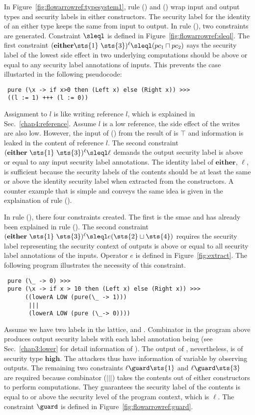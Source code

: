 In Figure~\ref{fig:flowarrowref:typesystem1}, rule () and () wrap input and output
types and security labels in either constructors. The security label for the identity of an either
type keeps the same from input to output.
In rule (), two constraints are generated. Constraint $\sleql$ is defined in 
Figure~\ref{fig:flowarrowref:sleql}.
The first constraint $(\mathbf{either} \sts{1}\ \sts{3})^\ell\sleql (pc_1\sqcap pc_2)$
says the security label of the lowest side effect in two underlying computations should be 
above or equal to any security label annotations of inputs. This prevents the case illustarted
in the following pseudocode:
\begin{verbatim}
 pure (\x -> if x>0 then (Left x) else (Right x)) >>>
 ((l := 1) +++ (l := 0))
\end{verbatim}
Assignment to $l$ is like writing reference $l$, which is explained in 
Sec.~\ref{chap4:reference}. Assume $l$ is a low reference, the side effect of the writes are also
low. However, the input of (\arrowop{+}) from the result of  is $\top$ and information is 
leaked in the content of reference $l$.
The second constraint $(\mathbf{either}\ \sts{1}\ \sts{3})^\ell\sleql \ell$ demands the output
security label is above or equal to any input security label annotations. The identity label of 
$\mathbf{either}$, $\ell$, is sufficient because the security labels of the contents should be 
at least the same or above the identity security label when extracted from the constructors.
A counter example that is simple and conveys the same idea is given in the explaination of 
rule ().

In rule (), there four constraints created. The first is the smae and has already been 
explained in rule (). The second constraint 
$(\mathbf{either}\ \sts{1}\ \sts{3})^\ell\sleql e(\sts{2}\sqcup \sts{4})$
requires the security label representing the security context of outputs is above or equal to
all security label annotations of the inputs. Operator $e$ is defined in Figure~\ref{fig:extract}.
The following program illustrates the necessity of this constraint.
\begin{verbatim}
 pure (\_ -> 0) >>>
 pure (\x -> if x > 10 then (Left x) else (Right x)) >>>
      ((lowerA LOW (pure(\_ -> 1))) 
       ||| 
       (lowerA LOW (pure (\_-> 0))))
\end{verbatim}
Assume we have two labels in the lattice,  and .
Combinator  in the program above produces output security labels with each label 
annotation being (see Sec.~\ref{chap3:lower} for detail information of ).
The output of , nevertheless, is of security type $\mathbf{high}$.
The attackers thus have information of  variable  by observing  outputs.
The remaining two constraints $\ell\guard \sts{1}$ and $\ell\guard \sts{3}$ are required because
combinator ($|||$) takes the contents out of either constructors to perform computations. 
They guarantees the security label of the contents is equal to or above the security level of
the program context, which is $\ell$.
The constraint $\guard$ is defined in Figure~\ref{fig:flowarrowref:guard}. 

